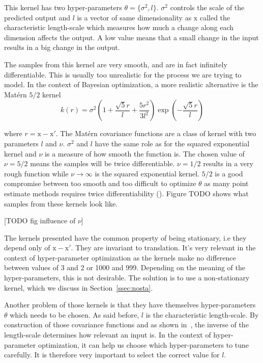 This kernel has two hyper-parameters $\theta = \{ \sigma^2 , l \}$. $\sigma^2$ controls the scale of the predicted output and $l$ is a vector of same dimensionality as $\mathrm{x}$ called the characteristic length-scale which measures how much a change along each dimension affects the output. A low value means that a small change in the input results in a big change in the output. 

The samples from this kernel are very smooth, and are in fact infinitely differentiable. This is usually too unrealistic for the process we are trying to model. In the context of Bayesian optimization, a more realistic alternative is the Matérn $5/2$ kernel
\begin{equation}
    k(r) = \sigma^2 \left( 1 + \frac{\sqrt{5}r}{l} + \frac{5r^2}{3l^2} \right) \exp \left( - \frac{\sqrt{5}r}{l}\right)
\end{equation}

where $r = \mathrm{x} - \mathrm{x'}$. The Matérn covariance functions are a class of kernel with two parameters $l$ and $\nu$. $\sigma^2$ and $l$ have the same role as for the squared exponential kernel and $\nu$ is a measure of how smooth the function is. The chosen value of $\nu = 5/2$ means the samples will be twice differentiable. $\nu = 1/2$ results in a very rough function while $\nu \to \infty$ is the squared exponential kernel. $5/2$ is a good compromise between too smooth and too difficult to optimize $\theta$ as many point estimate methods requires twice differentiability (\textcite{snoek2012NIPS}). Figure TODO shows what samples from these kernels look like.

[TODO fig influence of $\nu$]

The kernels presented have the common property of being stationary, i.e they depend only of $\mathrm{x} - \mathrm{x'}$. They are invariant to translation. It's very relevant in the context of hyper-parameter optimization as the kernels make no difference between values of 3 and 2 or 1000 and 999. Depending on the meaning of the hyper-parameters, this is not desirable. The solution is to use a non-stationary kernel, which we discuss in Section~\ref{ssec:nosta}.

Another problem of those kernels is that they have themselves hyper-parameters $\theta$ which needs to be chosen. As said before, $l$ is the characteristic length-scale. By construction of those covariance functions and as shown in~\textcite{neal1996phd}, the inverse of the length-scale determines how relevant an input is. In the context of hyper-parameter optimization, it can help us choose which hyper-parameters to tune carefully. It is therefore very important to select the correct value for $l$. 

